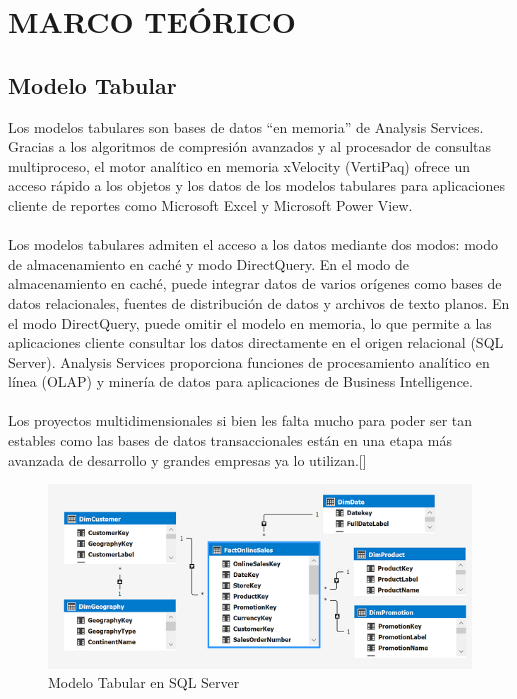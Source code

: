 \documentclass[11pt,a4paper]{article}
\begin{document}
	 \section{MARCO TEÓRICO}
	 
	 	\subsection{Modelo Tabular}
	 	
	 	Los modelos tabulares son bases de datos “en memoria” de Analysis Services. Gracias a los algoritmos de compresión avanzados y al procesador de consultas multiproceso, el motor analítico en memoria xVelocity (VertiPaq) ofrece un acceso rápido a los objetos y los datos de los modelos tabulares para aplicaciones cliente de reportes como Microsoft Excel y Microsoft Power View.\\
	 	\\
	 	Los modelos tabulares admiten el acceso a los datos mediante dos modos: modo de almacenamiento en caché y modo DirectQuery. En el modo de almacenamiento en caché, puede integrar datos de varios orígenes como bases de datos relacionales, fuentes de distribución de datos y archivos de texto planos. En el modo DirectQuery, puede omitir el modelo en memoria, lo que permite a las aplicaciones cliente consultar los datos directamente en el origen relacional (SQL Server).
	 	Analysis Services proporciona funciones de procesamiento analítico en línea (OLAP) y minería de datos para aplicaciones de Business Intelligence.\\
	 	\\
	 	Los proyectos multidimensionales si bien les falta mucho para poder ser tan estables como las bases de datos transaccionales están en una etapa más avanzada de desarrollo y grandes empresas ya lo utilizan.[\cite{sanchez2015modelacion}]
	 	
	 	\begin{figure}[!ht]
	 		\begin{center}
	 			\includegraphics[scale=1.5]{./IMAGENES/img01}	
	 			\caption{Modelo Tabular en SQL Server}		
	 		\end{center}
	 	\end{figure}
	 	
\end{document}
